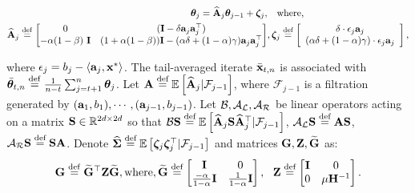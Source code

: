 \vspace{-0.2cm}
{\small\begin{align*}
\thetat = \Ahatj \thetat[j-1] + \zetat, &\quad \text{where,}\\
\Ahatj \defeq \begin{bmatrix} 0 & (\eye-\delta\ai[j]\ai[j]\T)\\ -\alpha(1-\beta)\ \eye & (1+\alpha(1-\beta))\eye-(\alpha\delta+(1-\alpha)\gamma)\ai[j]\ai[j]\T \end{bmatrix}&,
\zetat[j] \eqdef  \left[\begin{array}{c} \delta \cdot \ni[j] \ai[j] \\ (\alpha \delta + (1-\alpha)\gamma) \cdot \ni[j] \ai[j] \end{array}\right],
\end{align*}}%

\vspace{-0.2cm}
\noindent where $\epsilon_j=b_j-\iprod{\ai[j]}{\xs}$. The tail-averaged iterate $\bar{\x}_{t,n}$ is associated with $\thetavb\defeq\frac{1}{n-t}\sum_{j=t+1}^n\thetav_j$. Let $\A \eqdef \E{\Ahatj|\mathcal{F}_{j-1}}$, where $\mathcal{F}_{j-1}$ is a filtration generated by $(\a_1,b_1),\cdots,(\a_{j-1},b_{j-1})$. Let $\B,\AL,\AR$ be linear operators acting on a matrix $\S\in\R^{2d\times2d}$ so that $\B\S\eqdef \E{\Ahatj \S \Ahatj\T|\mathcal{F}_{j-1}}$, $\AL\S\eqdef\A\S$, $\AR\S\eqdef\S\A$. Denote $\Sighat\eqdef \E{\zetat \zetat \T|\mathcal{F}_{j-1}}$ and matrices $\G,\Z,\PM$ as:\vspace*{-2mm}
\begin{align*}
\G\defeq\PM \T \mat{Z}\PM , \text{where}, \PM\eqdef \begin{bmatrix} \Id &\zero \\ \frac{-\alpha}{1-\alpha}\Id & \frac{1}{1-\alpha}\Id \end{bmatrix},\ \ \mat{Z}\eqdef\begin{bmatrix} \Id &\zero \\ \zero & {\mu}\inv{\Cov}\end{bmatrix}.
\end{align*}

